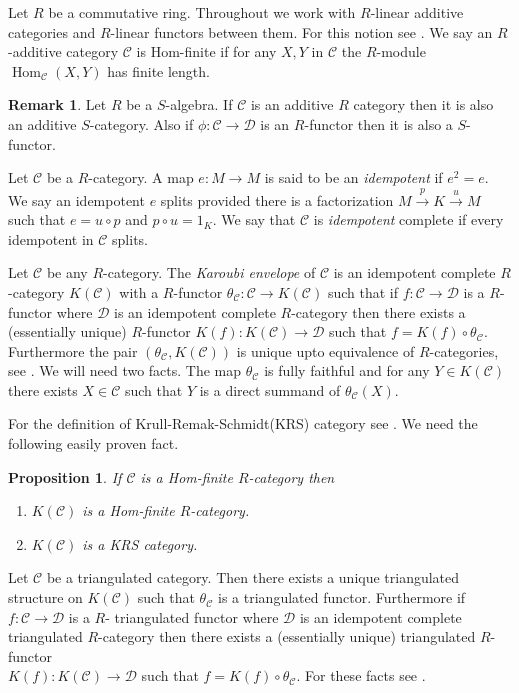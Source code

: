 \documentclass{amsart}
\newcommand{\D}{\mathcal{D} }
\newcommand{\C}{\mathcal{C}}
\newcommand{\rt}{\rightarrow}
\newcommand{\Hom}{\operatorname{Hom}}
\theoremstyle{plain}
\newtheorem{proposition}[theorem]{Proposition}
\theoremstyle{definition}
\newtheorem{remark}[theorem]{Remark}
\theoremstyle{remark}
\begin{document}
{\s Let $R$ be a commutative ring. Throughout we work with $R$-linear additive categories and $R$-linear functors between them.  For this notion see \cite[p.\ 28]{ARS}. We say an $R$-additive category $\C$ is Hom-finite if for any $X, Y$ in $\C$ the $R$-module $\Hom_\C(X, Y)$ has finite length.

\begin{remark}
Let $R$ be a $S$-algebra. If $\C$ is an additive $R$ category then it is also an additive $S$-category. Also if $\phi \colon \C \rt \D$ is an $R$-functor then it is also a $S$-functor.
\end{remark}

\s Let $\C$ be a $R$-category. A map $e \colon M \rt M$ is said to be an \emph{idempotent}
if $e^2 = e$. We say an idempotent $e$ splits provided there
is a factorization $M \xrightarrow{p} K \xrightarrow{u} M$ such that $e = u\circ p$ and $p\circ u = 1_K$. We say that $\C$ is \emph{idempotent} complete if every idempotent in $\C$ splits.


\s Let $\C$ be any $R$-category. The \emph{Karoubi envelope}  of $\C$ is an idempotent complete $R$-category $K(\C)$ with a $R$-functor $\theta_\C \colon \C \rt K(\C)$ such that if $f \colon \C \rt \D$ is a $R$-functor where $\D$ is an idempotent complete $R$-category then there exists a (essentially unique) $R$-functor $K(f) \colon K(\C) \rt \D$ such that
$f = K(f)\circ \theta_\C$. Furthermore the pair $(\theta_\C, K(\C))$ is unique upto equivalence of $R$-categories, see \cite[I.6.10]{Ka}. We will need two facts. The map $\theta_\C$ is fully faithful and for any  $Y \in K(\C)$ there exists $X \in \C$ such that
$Y$ is a direct summand of $\theta_\C(X)$.

For the definition of Krull-Remak-Schmidt(KRS) category see \cite[1.1.3]{LW}.
We need the following easily proven fact.
\begin{proposition}\label{K-hom-f}
If $\C$ is a Hom-finite $R$-category then
\begin{enumerate}[\rm (1)]
\item
$K(\C)$ is a Hom-finite $R$-category.
\item
$K(\C)$ is a KRS category.
\end{enumerate}
\end{proposition}

\s Let $\C$ be a triangulated category. Then there exists a unique triangulated structure on $K(\C)$ such that $\theta_\C$ is a triangulated functor. Furthermore if $f \colon \C \rt \D$ is a $R$- triangulated functor where $\D$ is an idempotent complete triangulated $R$-category then there exists a (essentially unique) triangulated  $R$-functor \\ $K(f) \colon K(\C) \rt \D$ such that
$f = K(f)\circ \theta_\C$. For these facts see \cite[1.5]{BS}.

}
\end{document}

